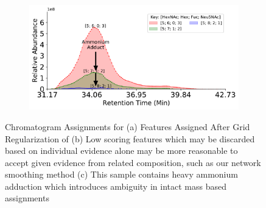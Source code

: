 \begin{figure}[tb]
\begin{minipage}{1\linewidth}
\begin{subfigure}[t]{0.49\linewidth}
                \subcaption{
                    \label{fig:rpserum_assignment:b}
                }
            \end{subfigure}
            \vspace{0pt}
            \begin{subfigure}[t]{0.49\linewidth}
                \includegraphics[width=1\linewidth, valign=b]{figure/ammonium_adduct_ambiguity.pdf}
                \subcaption{
                    \label{fig:rpserum_assignment:c}
                }
            \end{subfigure}
        \end{minipage}
        \caption{Chromatogram Assignments for \rpserum
            (a) Features Assigned After Grid Regularization of \rpserum (b) Low scoring features
            which may be discarded based on individual evidence alone may be more reasonable to accept
            given evidence from related composition, such as our network smoothing method (c) This sample
            contains heavy ammonium adduction which introduces ambiguity in intact mass based assignments
            \label{fig:rpserum_assignments}
        }
    \end{figure}

